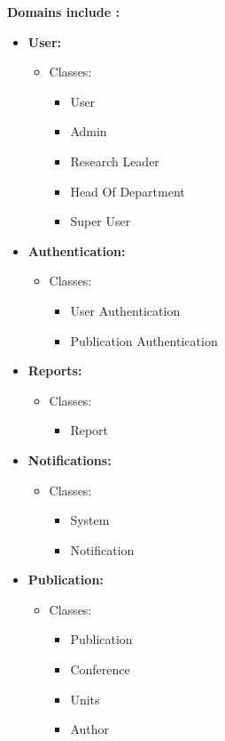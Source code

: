 \documentclass{article}
\begin{document}
			\clearpage
		\textbf{Domains include :}
			\begin{itemize} 
				\item \textbf{User:}
					\begin{itemize}
					\item Classes:
						\begin{itemize}
						\item User
						\item Admin
						\item Research Leader
						\item Head Of Department
						\item Super User
						\end{itemize}
					\end{itemize}
					
				\item \textbf{Authentication:}
					\begin{itemize}
					\item Classes:
						\begin{itemize}
						\item User Authentication
						\item Publication Authentication
						\end{itemize}
					\end{itemize}
					
				\item \textbf{Reports:}
					\begin{itemize}
					\item { Classes:}
						\begin{itemize}
						\item Report
						\end{itemize}
					\end{itemize}
					
				\item \textbf{Notifications:}
					\begin{itemize}
					\item { Classes:}
						\begin{itemize}
						\item System
						\item Notification
						\end{itemize}
					\end{itemize}
					
				\item \textbf{Publication:}
					\begin{itemize}
					\item { Classes:}
						\begin{itemize}
						\item Publication
						\item Conference
						\item Units
						\item Author
						\end{itemize}
					\end{itemize}				
				
			\end{itemize}
			
\end{document}
